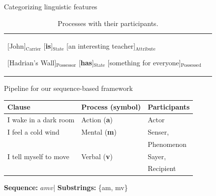 \documentclass[handout,10pt]{beamer}
\begin{document}
\begin{frame}{Categorizing linguistic features}
\begin{table}[!htb]
{\begin{tabular}{p{4cm}|p{11cm}}
        [John]$_{\text{Carrier}}$ [\textbf{is}]$_{\text{State}}$ [an interesting teacher]$_{\text{Attribute}}$ \newline
        
        [Hadrian's Wall]$_{\text{Possessor}}$ [\textbf{has}]$_{\text{State}}$ [something for everyone]$_{\text{Possessed}}$ \\ %
    \end{tabular}}
    \caption{Processes with their participants.}
    \label{tab:process_participants}
\end{table}
    
\end{frame}

\begin{frame}{Pipeline for our sequence-based framework}


\begin{table}[!ht]
  \centering
  \small
  \renewcommand{\arraystretch}{1.1}
  \begin{threeparttable}
    \label{tab:example}
    \begin{tabular}{lll}
      \textbf{Clause} & \textbf{Process (symbol)} & \textbf{Participants} \\
      \midrule
      I wake in a dark room         & Action (\textbf{a})  & Actor \\
      I feel a cold wind            & Mental (\textbf{m})  & Senser,\\
                                            &             & Phenomenon \\
      I tell myself to move         & Verbal (\textbf{v})  & Sayer,\\
                                            &             & Recipient \\
      \bottomrule
    \end{tabular}

    \begin{tablenotes}[flushleft]
      \footnotesize
      \item \textbf{Sequence:} $amv$\quad|\quad
            \textbf{Substrings:} \{am, mv\}
    \end{tablenotes}
  \end{threeparttable}
\end{table}


\end{frame}
\end{document}
